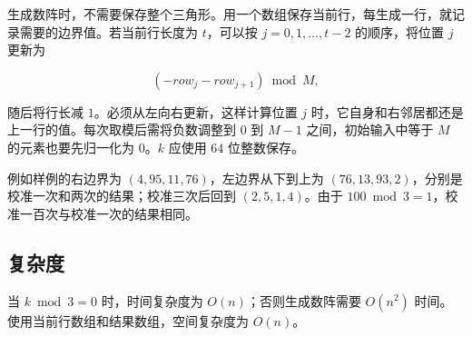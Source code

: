 \documentclass[UTF8,a4paper,11pt,fontset=none]{ctexart}
\newcommand{\topic}[1]{\Needspace{5\baselineskip}\subsection*{#1}}
\begin{document}
生成数阵时，不需要保存整个三角形。用一个数组保存当前行，每生成一行，就记录需要的边界值。若当前行长度为 $t$，可以按 $j=0,1,\ldots,t-2$ 的顺序，将位置 $j$ 更新为

\[
(-row_j-row_{j+1})\bmod M,
\]

随后将行长减 $1$。必须从左向右更新，这样计算位置 $j$ 时，它自身和右邻居都还是上一行的值。每次取模后需将负数调整到 $0$ 到 $M-1$ 之间，初始输入中等于 $M$ 的元素也要先归一化为 $0$。$k$ 应使用 $64$ 位整数保存。

例如样例的右边界为 $(4,95,11,76)$，左边界从下到上为 $(76,13,93,2)$，分别是校准一次和两次的结果；校准三次后回到 $(2,5,1,4)$。由于 $100\bmod 3=1$，校准一百次与校准一次的结果相同。

\topic{复杂度}
当 $k\bmod 3=0$ 时，时间复杂度为 $O(n)$；否则生成数阵需要 $O(n^2)$ 时间。使用当前行数组和结果数组，空间复杂度为 $O(n)$。
\end{document}
